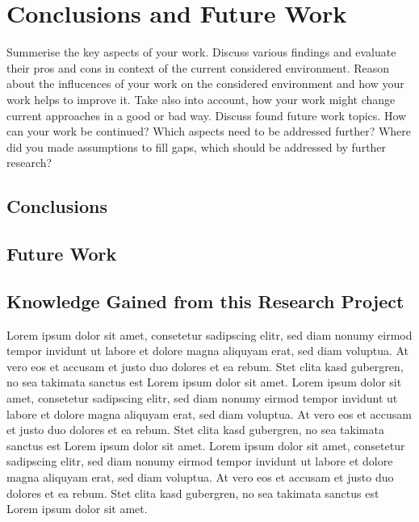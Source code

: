 \chapter{Conclusions and Future Work}
\label{ch:conclusion_future_work}

Summerise the key aspects of your work. Discuss various findings and evaluate
their pros and cons in context of the current considered environment. Reason
about the influcences of your work on the considered environment and how your
work helps to improve it. Take also into account, how your work might change
current approaches in a good or bad way. Discuss found future work topics. How
can your work be continued? Which aspects need to be addressed further? Where
did you made assumptions to fill gaps, which should be addressed by further
research?

\section{Conclusions}
\label{sec:conclusions}

\section{Future Work}
\label{sec:future_work}

\section{Knowledge Gained from this Research Project}
\label{sec:knowledge_gained}


Lorem ipsum dolor sit amet, consetetur sadipscing elitr, sed diam nonumy eirmod tempor invidunt ut labore et dolore magna aliquyam erat, sed diam voluptua. At vero eos et accusam et justo duo dolores et ea rebum. Stet clita kasd gubergren, no sea takimata sanctus est Lorem ipsum dolor sit amet. Lorem ipsum dolor sit amet, consetetur sadipscing elitr, sed diam nonumy eirmod tempor invidunt ut labore et dolore magna aliquyam erat, sed diam voluptua. At vero eos et accusam et justo duo dolores et ea rebum. Stet clita kasd gubergren, no sea takimata sanctus est Lorem ipsum dolor sit amet. Lorem ipsum dolor sit amet, consetetur sadipscing elitr, sed diam nonumy eirmod tempor invidunt ut labore et dolore magna aliquyam erat, sed diam voluptua. At vero eos et accusam et justo duo dolores et ea rebum. Stet clita kasd gubergren, no sea takimata sanctus est Lorem ipsum dolor sit amet.   

